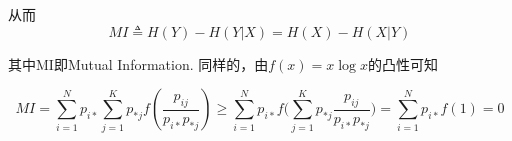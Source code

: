 \begin{remark}
    从而
    \begin{equation*}
        MI \triangleq H(Y) - H(Y|X) = H(X) - H(X|Y)
    \end{equation*}

    其中MI即Mutual Information. 同样的，由$f(x)=x\log x$的凸性可知

    \begin{equation*}
        MI = \sum_{i=1}^Np_{i*}\sum_{j=1}^K p_{*j} f(\frac{p_{ij}}{p_{i*}p_{*j}}) \geq \sum_{i=1}^Np_{i*}f\Big(\sum_{j=1}^K p_{*j} \frac{p_{ij}}{p_{i*}p_{*j}}\Big) = \sum_{i=1}^Np_{i*}f(1) = 0  
    \end{equation*}

\end{remark}